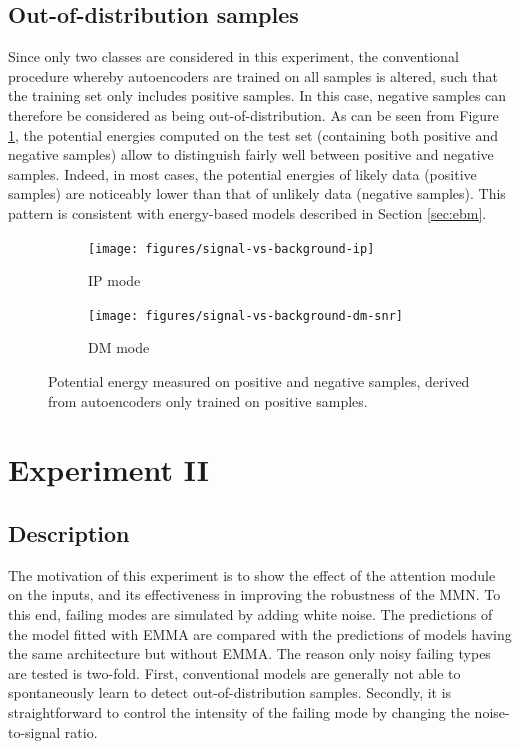 \subsection*{Out-of-distribution samples}
Since only two classes are considered in this experiment, the conventional procedure whereby autoencoders are trained on all samples is altered, such that the training set only includes positive samples. In this case, negative samples can therefore be considered as being out-of-distribution. As can be seen from Figure \ref{fig:pot-oof-signal}, the potential energies computed on the test set (containing both positive and negative samples) allow to distinguish fairly well between positive and negative samples. Indeed, in most cases, the potential energies of likely data (positive samples) are noticeably lower than that of unlikely data (negative samples). This pattern is consistent with energy-based models described in Section \ref{sec:ebm}.
\begin{figure}[!h]
\centering
\begin{subfigure}{.5\textwidth}
  \centering
  \texttt{[image: figures/signal-vs-background-ip]}
   \caption{IP mode}
\end{subfigure}%
\begin{subfigure}{.5\textwidth}
  \centering
  \texttt{[image: figures/signal-vs-background-dm-snr]}
   \caption{DM mode}
\end{subfigure}
\caption[Potential energy measured on out-of-distribution samples]{Potential energy measured on positive and negative samples, derived from autoencoders only trained on positive samples.}
\label{fig:pot-oof-signal}
\end{figure}



\newpage\section{Experiment II}\label{sec:expIII} 

\subsection{Description}

The motivation of this experiment is to show the effect of the attention module on the inputs, and its effectiveness in improving the robustness of the MMN. To this end, failing modes are simulated by adding white noise. The predictions of the model fitted with EMMA are compared with the predictions of models having the same architecture but without EMMA. The reason only noisy failing types are tested is two-fold. First, conventional models are generally not able to spontaneously learn to detect out-of-distribution samples. Secondly, it is straightforward to control the intensity of the failing mode by changing the noise-to-signal ratio. 

